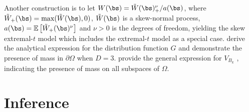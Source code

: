 \documentclass[12pt]{article}
\begin{document}
Another 
construction
is to let  $W(\bs)= \tilde{W}(\bs)_+^\nu / a(\bs)$, where $\tilde{W}_+(\bs) = \max(\tilde W(\bs),0)$, $\tilde W(\bs)$ is a skew-normal process, $a(\bs) = \mathbb{E} \left[ \tilde{W}_+(\bs)^\nu \right]$ and $\nu>0$ is the degrees of freedom, yielding the skew extremal-$t$ model \citep{Beranger.etal:2017} which includes the extremal-$t$ model \citep{Opitz:2013} as a special case. \citet{Beranger.etal:2017} derive the analytical expression for the distribution function $G$ and demonstrate the presence of mass in $\partial\Omega$ when $D=3$.
\cite{Beranger.etal:2021} provide the general expression for $V_{B_k}$ \citep[see][for results specific to the extremal-$t$]{Thibaud.Opitz:2015}, indicating the presence of mass on all subspaces of 
$\Omega$.

\section{Inference}
\label{sec:inference}

\end{document}
